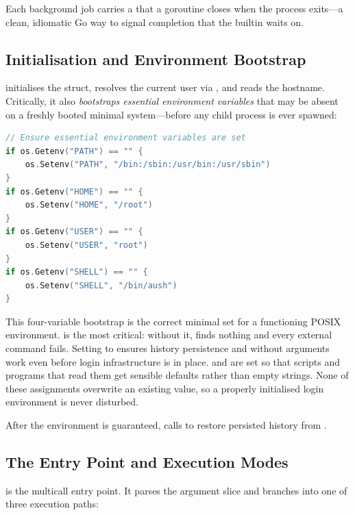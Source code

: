 Each background job carries a  that a goroutine closes when the
process exits---a clean, idiomatic Go way to signal completion that the
 builtin waits on.

\subsection{Initialisation and Environment Bootstrap}

 initialises the  struct, resolves the current user
via , and reads the hostname. Critically, it also
\emph{bootstraps essential environment variables} that may be absent on a freshly
booted minimal system---before any child process is ever spawned:

\begin{lstlisting}[language=Go, caption={Environment variable bootstrap in NewShell() (shell/shell.go)}]
// Ensure essential environment variables are set
if os.Getenv("PATH") == "" {
    os.Setenv("PATH", "/bin:/sbin:/usr/bin:/usr/sbin")
}
if os.Getenv("HOME") == "" {
    os.Setenv("HOME", "/root")
}
if os.Getenv("USER") == "" {
    os.Setenv("USER", "root")
}
if os.Getenv("SHELL") == "" {
    os.Setenv("SHELL", "/bin/aush")
}
\end{lstlisting}

This four-variable bootstrap is the correct minimal set for a functioning POSIX
environment.  is the most critical: without it, 
finds nothing and every external command fails. Setting  to
 ensures history persistence and  without arguments work
even before login infrastructure is in place.  and  are
set so that scripts and programs that read them get sensible defaults rather than
empty strings. None of these assignments overwrite an existing value, so a
properly initialised login environment is never disturbed.

After the environment is guaranteed,  calls  to
restore persisted history from .

\subsection{The  Entry Point and Execution Modes}

 is the multicall entry point. It parses the argument slice and
branches into one of three execution paths:

